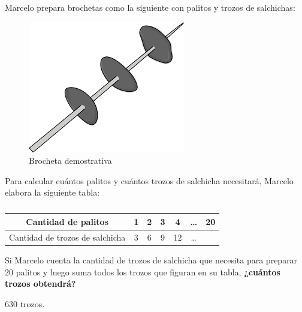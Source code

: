 \question[10] Marcelo prepara brochetas como la siguiente con palitos y trozos de salchichas:

\begin{minipage}{0.4\linewidth}
    \begin{figure}[H]
        \centering
        \includegraphics[width=0.9\linewidth]{../images/8cc56669378bdf27d863fffcaffb0080db06805e}
        \caption{Brocheta demostrativa}
        \label{fig:8cc56669378bdf27d863fffcaffb0080db06805e}
    \end{figure}
\end{minipage}\hfill
\begin{minipage}{0.6\linewidth}
    Para calcular cuántos palitos y cuántos trozos de salchicha necesitará, Marcelo elabora la siguiente tabla:

    \begin{table}[H]
        \centering
        \caption{}
        \label{tab:estampillas}
        \begin{tabular}{c|c|c|c|c|c|c}
            Cantidad de palitos             & 1 & 2 & 3 & 4  & \dots & 20 \\ \hline
            Cantidad de trozos de salchicha & 3 & 6 & 9 & 12 & \dots &    \\
        \end{tabular}
    \end{table}


    Si Marcelo cuenta la cantidad de trozos de salchicha que necesita para preparar
    20 palitos y luego suma todos los trozos que figuran en su tabla,
    \textbf{¿cuántos trozos obtendrá?}

    \begin{solutionbox}{1.2cm}
        630 trozos.
    \end{solutionbox}

\end{minipage}